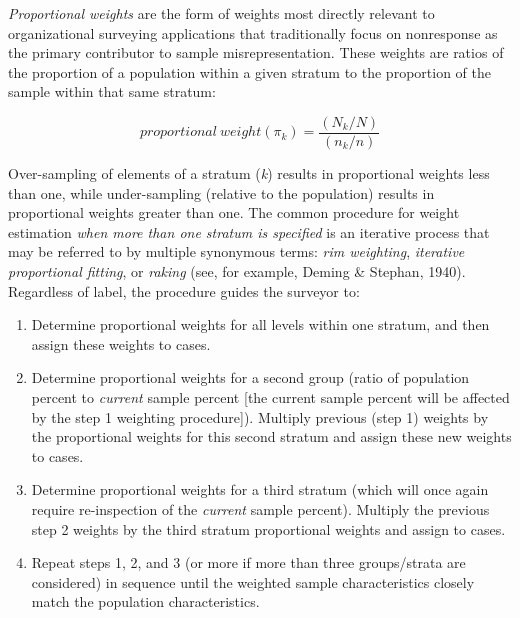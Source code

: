 \documentclass[
  ,man,floatsintext]{apa6}
\begin{document}
\emph{Proportional weights} are the form of weights most directly relevant to organizational surveying applications that traditionally focus on nonresponse as the primary contributor to sample misrepresentation. These weights are ratios of the proportion of a population within a given stratum to the proportion of the sample within that same stratum:

\begin{equation}
proportional \: weight(\pi_k) = \frac{(N_k/N)}{(n_k/n)}
\end{equation}

Over-sampling of elements of a stratum (\emph{k}) results in proportional weights less than one, while under-sampling (relative to the population) results in proportional weights greater than one.
The common procedure for weight estimation \emph{when more than one stratum is specified} is an iterative process that may be referred to by multiple synonymous terms: \emph{rim weighting}, \emph{iterative proportional fitting}, or \emph{raking} (see, for example, Deming \& Stephan, 1940). Regardless of label, the procedure guides the surveyor to:

\begin{enumerate}
\def\labelenumi{\arabic{enumi})}
\item
  Determine proportional weights for all levels within one stratum, and then assign these weights to cases.
\item
  Determine proportional weights for a second group (ratio of population percent to \emph{current} sample percent {[}the current sample percent will be affected by the step 1 weighting procedure{]}). Multiply previous (step 1) weights by the proportional weights for this second stratum and assign these new weights to cases.
\item
  Determine proportional weights for a third stratum (which will once again require re-inspection of the \emph{current} sample percent). Multiply the previous step 2 weights by the third stratum proportional weights and assign to cases.
\item
  Repeat steps 1, 2, and 3 (or more if more than three groups/strata are considered) in sequence until the weighted sample characteristics closely match the population characteristics.
\end{enumerate}
\end{document}
